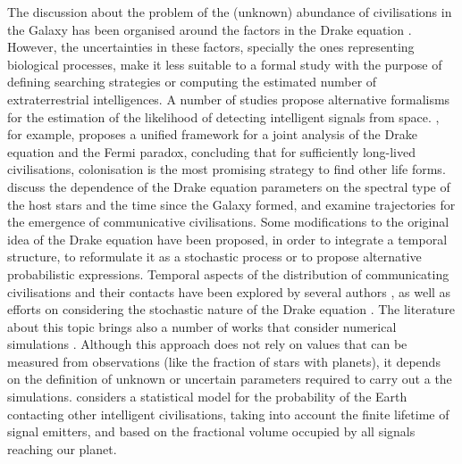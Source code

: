 \documentclass[crop]{CSLB}
\begin{document}
The discussion about the problem of the (unknown)
abundance of civilisations in the Galaxy has been organised around the
factors in the Drake equation \citep{hinkel_interdisciplinary_2019}.
%
However, the uncertainties in these factors, specially the ones
representing biological processes, make it
less suitable to a formal study with the purpose of defining
searching strategies or
computing the estimated number of extraterrestrial intelligences.
%
%
%
A number of studies propose alternative formalisms for the estimation of the
likelihood of detecting intelligent signals from space.
%
\citet{prantzos_joint_2013}, for example, proposes a unified framework for a joint
analysis of the Drake equation and the Fermi paradox, concluding that
for sufficiently long-lived civilisations, colonisation
is the most promising strategy to find other life forms.
%
\citet{haqq-misra_drake_2017} discuss the dependence of the Drake
equation parameters on the spectral type of the host stars and the
time since the Galaxy formed, and examine trajectories for the
emergence of communicative civilisations.
%
Some modifications to the original idea of the Drake equation have
been proposed, in order to
integrate a temporal structure, to
reformulate it as a stochastic process or to propose alternative
probabilistic expressions.
%
Temporal aspects of the distribution of communicating civilisations
and their contacts have been explored by several authors
\citep{fogg_temporal_1987, forgan_spatiotemporal_2011,
balbi_impact_2018, balb_spatiotemporal_2018, horvat_impact_2011}, as
well as efforts on considering the stochastic nature of the Drake
equation \citep{glade_stochastic_2011}.
%
The literature about this topic brings also a number of works that consider
numerical simulations \citep{forgan_evaluating_2015,
vukotic_grandeur_2016, murante_simulating_2015, forgan_numerical_2009,
forgan_galactic_2017, ramirez_new_2017}.
%
Although this approach does not rely on values that can be measured
from observations
(like the fraction of stars with planets), 
it depends on the definition of
unknown or uncertain parameters required to carry out
a the simulations.
%
\citet{grimaldi_signal_2017} considers a statistical model for the
probability of the Earth contacting other intelligent civilisations,
taking into account the finite lifetime of signal emitters, and based
on the fractional volume occupied by all signals reaching our planet.
\end{document}
